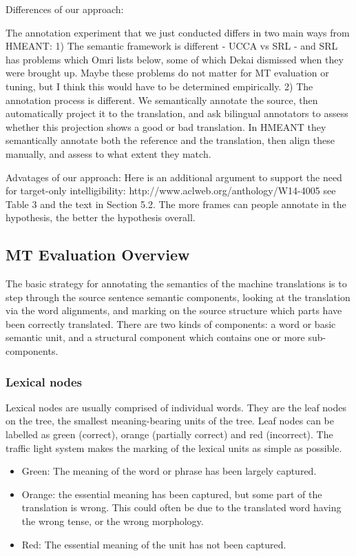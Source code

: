 \documentclass[11pt]{article}
\begin{document}
Differences of our approach:

The annotation experiment that we just conducted differs in two main ways from HMEANT:
1) The semantic framework is different - UCCA vs SRL - and SRL has problems which Omri lists below, some of which Dekai dismissed when they were brought up. Maybe these problems do not matter for MT evaluation or tuning, but I think this would have to be determined empirically.
2) The annotation process is different. We semantically annotate the source, then automatically project it to the translation, and ask bilingual annotators to assess whether this projection shows a good or bad translation. In HMEANT they semantically annotate both the reference and the translation, then align these manually, and assess to what extent they match.

Advatages of our approach:
Here is an additional argument to support the need for target-only intelligibility:
http://www.aclweb.org/anthology/W14-4005
see Table  3 and the text in Section 5.2.
The more frames can people annotate in the hypothesis, the better the hypothesis overall.



\subsection{MT Evaluation Overview}

The basic strategy for annotating the semantics of the machine translations is to step through the source sentence semantic 
components, looking at the translation via the word alignments, and marking on the source structure
which parts have 
been correctly translated.
There are two kinds of components: a word or basic semantic unit, and a structural component which contains one or more sub-components. 

\subsubsection{Lexical nodes}
Lexical nodes are usually comprised of individual words. They are the leaf nodes on the tree, the smallest 
meaning-bearing
units of the tree.
Leaf nodes can be labelled as green (correct), orange (partially correct) and red (incorrect). 
The traffic light system makes the marking of the
lexical units as simple as possible.

\begin{itemize}
\item Green: The meaning of the word or phrase has been largely captured.
\item Orange: the essential meaning has been captured, but some part of the translation is wrong. This could often be due to the translated word having the wrong tense, or the wrong morphology. 
\item Red: The essential meaning of the unit has not been captured.
\end{itemize}
\end{document}
